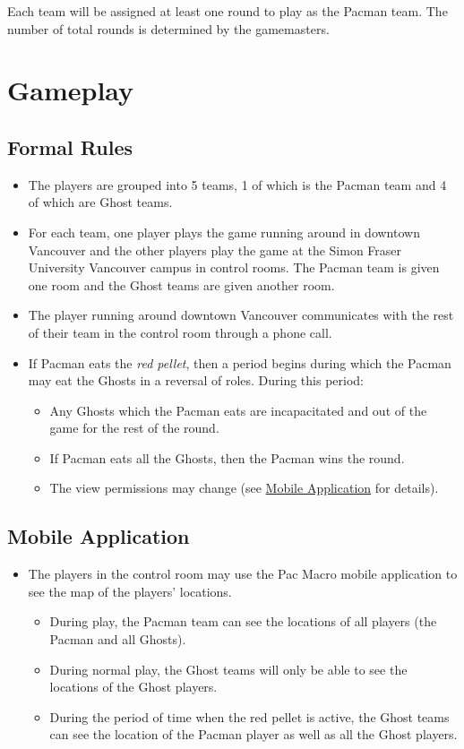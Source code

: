 \documentclass[10pt, oneside, letterpaper, titlepage]{article}
\begin{document}
	Each team will be assigned at least one round to play as the Pacman team. The number of total rounds is determined by the gamemasters.

	\section{Gameplay}
	\label{sec:gameplay}

	\subsection{Formal Rules}
	\label{subsec:gameplay:formal-rules}

	\begin{itemize}
		\item The players are grouped into 5 teams, 1 of which is the Pacman team and 4 of which are Ghost teams.
		\item For each team, one player plays the game running around in downtown Vancouver and the other players play the game at the Simon Fraser University Vancouver campus in control rooms. The Pacman team is given one room and the Ghost teams are given another room.
		\item The player running around downtown Vancouver communicates with the rest of their team in the control room through a phone call.
		\item If Pacman eats the \emph{red pellet}, then a period begins during which the Pacman may eat the Ghosts in a reversal of roles. During this period:
		\begin{itemize}
			\item Any Ghosts which the Pacman eats are incapacitated and out of the game for the rest of the round.
			\item If Pacman eats all the Ghosts, then the Pacman wins the round.
			\item The view permissions may change (see \hyperref[subsec:gameplay:mobile-application]{Mobile Application} for details).
		\end{itemize}
	\end{itemize}

	\subsection{Mobile Application}
	\label{subsec:gameplay:mobile-application}

	\begin{itemize}
		\item The players in the control room may use the Pac Macro mobile application to see the map of the players' locations.
		\begin{itemize}
			\item During play, the Pacman team can see the locations of all players (the Pacman and all Ghosts).
			\item During normal play, the Ghost teams will only be able to see the locations of the Ghost players.
			\item During the period of time when the red pellet is active, the Ghost teams can see the location of the Pacman player as well as all the Ghost players.
		\end{itemize}
	\end{itemize}
\end{document}
